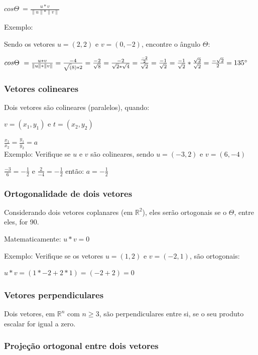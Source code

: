 \documentclass[12pt]{article}
\begin{document}
\(cos \Theta\ = \frac{u * v}{\|u\|*\|v\|}\)

Exemplo:

Sendo os vetores \(u = (2,2)\) e \(v=(0, -2)\), encontre o ângulo $\Theta$:

\(cos \Theta\ = \frac{u * v}{\|u\|*\|v\|} = \frac{-4}{\sqrt(8)*2} = \frac{-2}{\sqrt{8}}=\frac{-2}{\sqrt{2}*\sqrt{4}}=\frac{\frac{-2}{2}}{\sqrt{2}} = \frac{-1}{\sqrt{2}} = \frac{-1}{\sqrt{2}} * \frac{\sqrt{2}}{\sqrt{2}} = \frac{-\sqrt{2}}{2} = 135\degree\)

\subsubsection{Vetores colineares}

Dois vetores são colineares (paralelos), quando:

\(v = (x_{1}, y_{1})\) e \(t = (x_{2}, y_{2})\)

\(\frac{x_{1}}{x_{2}} = \frac{y_{1}}{y_{2}} = a\)
\\

Exemplo: Verifique se \(u\) e \(v\) são colineares, sendo \(u = (-3, 2)\) e \(v=(6,-4)\)

\(\frac{-3}{6} = -\frac{1}{2}\) e \(\frac{2}{-4} = -\frac{1}{2}\) então: \(a = -\frac{1}{2}\)

\subsubsection{Ortogonalidade de dois vetores}

Considerando dois vetores coplanares (em \(\mathbb{R}^2\)), eles serão ortogonais se o $\Theta$, entre eles, for 90\degree.

Matematicamente: \(u * v = 0\)

Exemplo: Verifique se os vetores \(u = (1, 2)\) e \(v = (-2, 1)\), são ortogonais:

\(u * v = (1 * -2 + 2 * 1) = (-2 + 2) = 0\)


\subsubsection{Vetores perpendiculares}

Dois vetores, em \(\mathbb{R}^n\) com \(n \geq 3\), são perpendiculares entre si, se o seu produto escalar for igual a zero.

\subsubsection{Projeção ortogonal entre dois vetores}
\end{document}
